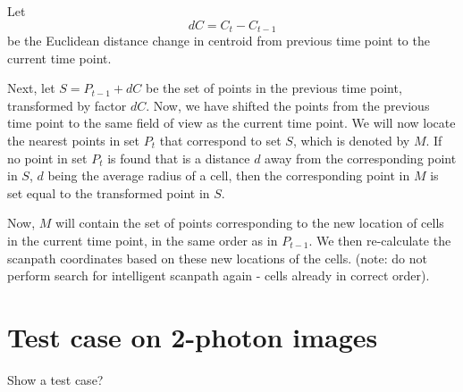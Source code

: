 \documentclass{article}
\begin{document}
Let  
\begin{displaymath}
dC = C_t - C_{t-1}
\end{displaymath}
be the Euclidean distance change in centroid from previous time point to the current time point.  

Next, let $S = P_{t-1} + dC$ be the set of points in the previous time point, transformed by factor $dC$.  Now, we have shifted the points from the previous time point to the same field
of view as the current time point.  We will now locate the nearest points in set $P_t$ that correspond to set $S$, which is denoted by $M$.  If no point in set $P_t$ is found that is a distance
$d$ away from the corresponding point in $S$, $d$ being the average radius of a cell, then the corresponding point in $M$ is set equal to the transformed point in $S$.  

Now, $M$ will contain the set of points corresponding to the new location of cells in the current time point, in the same order as in $P_{t-1}$.  We then re-calculate the scanpath coordinates
based on these new locations of the cells.  (note: do not perform search for intelligent scanpath again - cells already in correct order).  


\section{Test case on 2-photon images}

Show a test case?
\\
\\
\\







\end{document}
